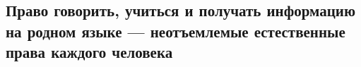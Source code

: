  
 
 
 
 

\subsection{Право говорить, учиться и получать информацию на родном языке — неотъемлемые естественные права каждого человека}

